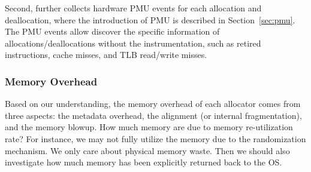 % 

Second, \MP{} further collects hardware PMU events for each allocation and deallocation, where the introduction of PMU is described in Section~\ref{sec:pmu}. The PMU events allow \MP{} discover the specific information of allocations/deallocations without the instrumentation, such as retired instructions, cache misses, and TLB read/write misses. 



\begin{comment}
Can we integrate the cache misses or page faults for each allocation and deallocation, so that we could identify the issue of DieHarder that invokes many unnecessary cache misses?

If we could correlate cache misses to each thread, then we could do this. 

If allocation and deallocation takes too much time, it could be caused by multiple reasons:

(1) First, it just takes a lot of instructions (could we find out the lapsed instructions for each thread?)
(2) It may be caused by not good algorithm? 
(3) It can be caused by lock contention?
(4) It can be caused by system call related contention?
\end{comment} 

\subsubsection{Memory Overhead}

Based on our understanding, the memory overhead of each allocator comes from three aspects: the metadata overhead, the alignment (or internal fragmentation), and the memory blowup. 
How much memory are due to memory re-utilization rate? For instance, we may not fully utilize the memory due to the randomization mechanism. We only care about physical memory waste. Then we should also investigate how much memory has been explicitly returned back to the OS. 

